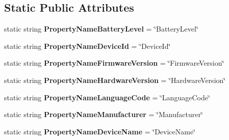 \subsection*{Static Public Attributes}
\begin{DoxyCompactItemize}
\item 
\hypertarget{classClient_1_1Common_1_1Models_1_1Device_ac51bdfcd52ea6fcb3ebbc379ecc82829}{static string {\bfseries Property\-Name\-Battery\-Level} = \char`\"{}Battery\-Level\char`\"{}}\label{classClient_1_1Common_1_1Models_1_1Device_ac51bdfcd52ea6fcb3ebbc379ecc82829}

\item 
\hypertarget{classClient_1_1Common_1_1Models_1_1Device_aea7be474dead31b9fcabffdb266f7a03}{static string {\bfseries Property\-Name\-Device\-Id} = \char`\"{}Device\-Id\char`\"{}}\label{classClient_1_1Common_1_1Models_1_1Device_aea7be474dead31b9fcabffdb266f7a03}

\item 
\hypertarget{classClient_1_1Common_1_1Models_1_1Device_ab66cfe6644008ed175969d9dc9276827}{static string {\bfseries Property\-Name\-Firmware\-Version} = \char`\"{}Firmware\-Version\char`\"{}}\label{classClient_1_1Common_1_1Models_1_1Device_ab66cfe6644008ed175969d9dc9276827}

\item 
\hypertarget{classClient_1_1Common_1_1Models_1_1Device_a8fe8d07281f944b0f402859b6da8eb59}{static string {\bfseries Property\-Name\-Hardware\-Version} = \char`\"{}Hardware\-Version\char`\"{}}\label{classClient_1_1Common_1_1Models_1_1Device_a8fe8d07281f944b0f402859b6da8eb59}

\item 
\hypertarget{classClient_1_1Common_1_1Models_1_1Device_a009bb1cd55e95065c37ce793c09d8065}{static string {\bfseries Property\-Name\-Language\-Code} = \char`\"{}Language\-Code\char`\"{}}\label{classClient_1_1Common_1_1Models_1_1Device_a009bb1cd55e95065c37ce793c09d8065}

\item 
\hypertarget{classClient_1_1Common_1_1Models_1_1Device_abdd5f3df306c43e6a9a36616d60ff66a}{static string {\bfseries Property\-Name\-Manufacturer} = \char`\"{}Manufacturer\char`\"{}}\label{classClient_1_1Common_1_1Models_1_1Device_abdd5f3df306c43e6a9a36616d60ff66a}

\item 
\hypertarget{classClient_1_1Common_1_1Models_1_1Device_a92eaec1dc6ba592a7b7c9fc66b71c2bc}{static string {\bfseries Property\-Name\-Device\-Name} = \char`\"{}Device\-Name\char`\"{}}\label{classClient_1_1Common_1_1Models_1_1Device_a92eaec1dc6ba592a7b7c9fc66b71c2bc}


\end{DoxyCompactItemize}
